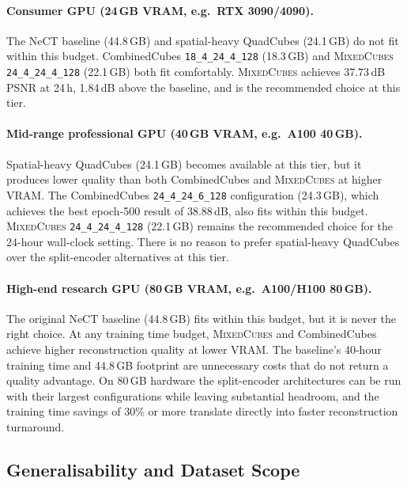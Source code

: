 \documentclass[12pt, a4paper, twoside]{report}
\newcommand{\MixedCubes}{\textsc{MixedCubes}}
\begin{document}
\paragraph{Consumer GPU (24\,GB VRAM, e.g.\ RTX 3090/4090).}
The NeCT baseline (44.8\,GB) and spatial-heavy QuadCubes (24.1\,GB) do not fit within this budget. CombinedCubes \texttt{18\_4\_24\_4\_128} (18.3\,GB) and \MixedCubes{} \texttt{24\_4\_24\_4\_128} (22.1\,GB) both fit comfortably. \MixedCubes{} achieves 37.73\,dB PSNR at 24\,h, 1.84\,dB above the baseline, and is the recommended choice at this tier.

\paragraph{Mid-range professional GPU (40\,GB VRAM, e.g.\ A100 40\,GB).}
Spatial-heavy QuadCubes (24.1\,GB) becomes available at this tier, but it produces lower quality than both CombinedCubes and \MixedCubes{} at higher VRAM. The CombinedCubes \texttt{24\_4\_24\_6\_128} configuration (24.3\,GB), which achieves the best epoch-500 result of 38.88\,dB, also fits within this budget. \MixedCubes{} \texttt{24\_4\_24\_4\_128} (22.1\,GB) remains the recommended choice for the 24-hour wall-clock setting. There is no reason to prefer spatial-heavy QuadCubes over the split-encoder alternatives at this tier.

\paragraph{High-end research GPU (80\,GB VRAM, e.g.\ A100/H100 80\,GB).}
The original NeCT baseline (44.8\,GB) fits within this budget, but it is never the right choice. At any training time budget, \MixedCubes{} and CombinedCubes achieve higher reconstruction quality at lower VRAM. The baseline's 40-hour training time and 44.8\,GB footprint are unnecessary costs that do not return a quality advantage. On 80\,GB hardware the split-encoder architectures can be run with their largest configurations while leaving substantial headroom, and the training time savings of 30\% or more translate directly into faster reconstruction turnaround.

\subsection{Generalisability and Dataset Scope}
\label{subsec:comp_disc_generalisability}
\end{document}
